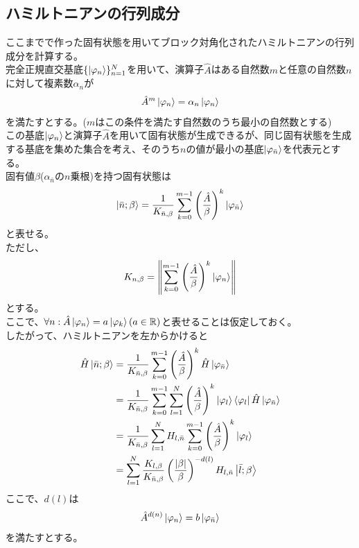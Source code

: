 \documentclass{ltjsarticle}
\begin{document}
\subsection{ハミルトニアンの行列成分}
ここまでで作った固有状態を用いてブロック対角化されたハミルトニアンの行列成分を計算する。\\
完全正規直交基底$\lbrace\ket{\varphi_n}\rbrace_{n=1}^N$を用いて、演算子$\hat{A}$はある自然数$m$と任意の自然数$n$に対して複素数$\alpha_n$が
\begin{align}
  \hat{A}^{m}\ket{\varphi_n} = \alpha_n\ket{\varphi_n}
\end{align}
を満たすとする。($m$はこの条件を満たす自然数のうち最小の自然数とする)\\
この基底$\ket{\varphi_n}$と演算子$\hat{A}$を用いて固有状態が生成できるが、同じ固有状態を生成する基底を集めた集合を考え、そのうち$n$の値が最小の基底$\ket{\varphi_{\bar{n}}}$を代表元とする。\\
固有値$\beta$($\alpha_{\bar{n}}$の$n$乗根)を持つ固有状態は
\begin{align}
  \ket{\bar{n};\beta}= \frac{1}{K_{\bar{n},\beta}}\sum_{k=0}^{m-1} \left(\frac{\hat{A}}{\beta} \right)^k \ket{\varphi_{\bar{n}}}
\end{align}
と表せる。\\
ただし、
\begin{align}
  K_{n,\beta}=\norm{\sum_{k=0}^{m-1} \left(\frac{\hat{A}}{\beta} \right)^k \ket{\varphi_{n}}}
\end{align}
とする。\\
ここで、$\forall n:\hat{A}\ket{\varphi_n}=a\ket{\varphi_k}(a\in\mathbb{R})$と表せることは仮定しておく。\\
したがって、ハミルトニアンを左からかけると
\begin{align}
  \hat{H}\ket{\bar{n};\beta} &= \frac{1}{K_{\bar{n},\beta}}\sum_{k=0}^{m-1} \left(\frac{\hat{A}}{\beta} \right)^k \hat{H}\ket{\varphi_{\bar{n}}}\\
  &= \frac{1}{K_{\bar{n},\beta}}\sum_{k=0}^{m-1}\sum_{l=1}^{N} \left(\frac{\hat{A}}{\beta} \right)^k \ket{\varphi_{l}}\bra{\varphi_{l}}\hat{H}\ket{\varphi_{\bar{n}}}\\
  &= \frac{1}{K_{\bar{n},\beta}}\sum_{l=1}^{N}H_{l,\bar{n}}\sum_{k=0}^{m-1} \left(\frac{\hat{A}}{\beta} \right)^k \ket{\varphi_{l}}\\
  &=\sum_{l=1}^{N}\frac{K_{l,\beta}}{K_{\bar{n},\beta}}\left(\frac{\abs{\beta}}{\beta}\right)^{-d(l)} H_{l,\bar{n}}\ket{\bar{l};\beta}\\
\end{align}
ここで、$d(l)$は
\begin{align}
  \hat{A}^{d(n)}\ket{\varphi_n}=b\ket{\varphi_{\bar{n}}}
\end{align}
を満たすとする。
\end{document}
